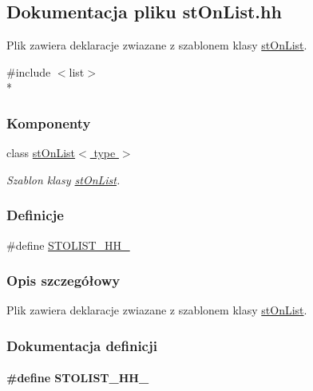 \hypertarget{st_on_list_8hh}{\subsection{Dokumentacja pliku st\-On\-List.\-hh}
\label{st_on_list_8hh}
}


Plik zawiera deklaracje zwiazane z szablonem klasy \hyperlink{classst_on_list}{st\-On\-List}.  


{\ttfamily \#include $<$list$>$}\\*
\subsubsection*{Komponenty}
\begin{DoxyCompactItemize}
\item 
class \hyperlink{classst_on_list}{st\-On\-List$<$ type $>$}
\begin{DoxyCompactList}\small\item\em Szablon klasy \hyperlink{classst_on_list}{st\-On\-List}. \end{DoxyCompactList}\end{DoxyCompactItemize}
\subsubsection*{Definicje}
\begin{DoxyCompactItemize}
\item 
\#define \hyperlink{st_on_list_8hh_aadcf99116a237f6912e93474bfa390ee}{S\-T\-O\-L\-I\-S\-T\-\_\-\-H\-H\-\_\-}
\end{DoxyCompactItemize}


\subsubsection{Opis szczegółowy}
Plik zawiera deklaracje zwiazane z szablonem klasy \hyperlink{classst_on_list}{st\-On\-List}. 

\subsubsection{Dokumentacja definicji}
\hypertarget{st_on_list_8hh_aadcf99116a237f6912e93474bfa390ee}{
\paragraph[{S\-T\-O\-L\-I\-S\-T\-\_\-\-H\-H\-\_\-}]{\setlength{\rightskip}{0pt plus 5cm}\#define S\-T\-O\-L\-I\-S\-T\-\_\-\-H\-H\-\_\-}}\label{st_on_list_8hh_aadcf99116a237f6912e93474bfa390ee}
